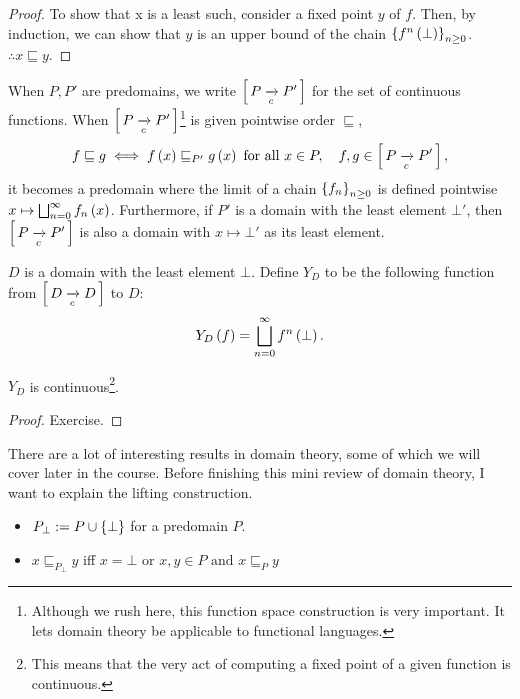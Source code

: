 \begin{enumcirc}
\begin{proof}
		To show that x is a least such, consider a fixed point $y$ of $f$.
		Then, by induction, we can show that $y$ is an upper bound of the chain
		$\left\{ f^n \left( \bot \right) \right\}_{n \geq 0}$.
		$\therefore x \sqsubseteq y$.
	\end{proof}
	\item
	When $P, P'$ are predomains, we write $\left[ \, P \xrightarrow[c]{} P' \, \right]$ for the set of
	continuous functions.
	When $\left[ \, P \xrightarrow[c]{} P' \, \right]$\footnote{
		\begin{minipage}{0.9\textwidth}
			Although we rush here, this function space construction is very important.
			It lets domain theory be applicable to functional languages.
		\end{minipage}
	} is given pointwise order
	$\sqsubseteq$,
	\[
		f \sqsubseteq g \iff f \left( x \right) \sqsubseteq_{P'} g \left( x \right)
		\textrm{ for all } x \in P, \quad f, g \in \left[ \, P \xrightarrow[c]{} P' \, \right],
	\]
	it becomes a predomain where the limit of a chain $\left\{ f_n \right\}_{n \geq 0}$ is
	defined pointwise $x \mapsto \bigsqcup_{n = 0}^\infty f_n \left( x \right)$.
	Furthermore, if $P'$ is a domain with the least element $\bot'$, then
	$\left[ \, P \xrightarrow[c]{} P' \, \right]$ is also a domain with $x \mapsto \bot'$ as its least
	element.
	\item
	$D$ is a domain with the least element $\bot$.
	Define $Y_D$ to be the following function from $\left[ \, D \xrightarrow[c]{} D \, \right]$ to $D$:
	\[
		Y_D \left( f \right) = \bigsqcup_{n = 0}^{\infty} f^n \left( \bot \right).
	\]
	\begin{lemma}
		$Y_D$ is continuous\footnote{%
			This means that the very act of computing a fixed point of a given function is continuous.%
		}.
	\end{lemma}
	\begin{proof}
		Exercise.
	\end{proof}
	\item
	There are a lot of interesting results in domain theory, some of which we will
	cover later in the course.
	Before finishing this mini review of domain theory, I want to explain the
	lifting construction.
	\begin{enumrm}
		\item
		\begin{itemize}
			\item
			      $P_\bot := P \cup \left\{ \bot \right\}$ for a predomain $P$.
			\item
			      $x \sqsubseteq_{P_\bot} y$ iff $x = \bot$ or $x, y \in P \textrm{ and } x \sqsubseteq_P y$

\end{itemize}
\end{enumrm}
\end{enumcirc}
